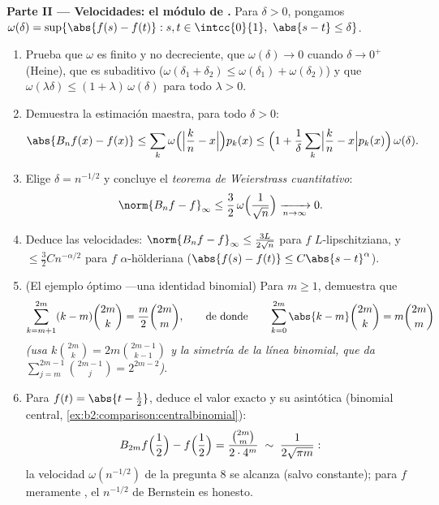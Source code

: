 \begin{problem}
\medskip
\noindent\textbf{Parte II --- Velocidades: el módulo de
.} Para $\delta > 0$, pongamos $\omega(\delta) =
\sup\{\abs{f(s) - f(t)} : s, t \in \intcc{0}{1},\ \abs{s - t} \leq
\delta\}$.
\begin{enumerate}[resume]
  \item Prueba que $\omega$ es finito y no decreciente, que
        $\omega(\delta) \to 0$ cuando $\delta \to 0^+$ (Heine), que
        es subaditivo ($\omega(\delta_1 + \delta_2) \leq
        \omega(\delta_1) + \omega(\delta_2)$) y que
        $\omega(\lambda\delta) \leq (1 + \lambda)\,\omega(\delta)$
        para todo $\lambda > 0$.
  \item Demuestra la estimación maestra, para todo $\delta > 0$:
        \[
        \abs{B_nf(x) - f(x)}
        \leq \sum_k \omega\Bigl(\Bigl|\frac kn -
        x\Bigr|\Bigr)p_k(x)
        \leq \Bigl(1 + \frac1\delta\sum_k\Bigl|\frac kn -
        x\Bigr|p_k(x)\Bigr)\,\omega(\delta) .
        \]
  \item Elige $\delta = n^{-1/2}$ y concluye el \emph{teorema de
        Weierstrass cuantitativo}:
        \[
        \norm{B_nf - f}_\infty \leq
        \frac32\,\omega\Bigl(\frac{1}{\sqrt n}\Bigr)
        \xrightarrow[n\to\infty]{} 0 .
        \]
  \item Deduce las velocidades: $\norm{B_nf - f}_\infty \leq
        \frac{3L}{2\sqrt n}$ para $f$ $L$-lipschitziana, y $\leq
        \frac32 C n^{-\alpha/2}$ para $f$ $\alpha$-hölderiana
        ($\abs{f(s) - f(t)} \leq C\abs{s-t}^\alpha$).
  \item (El ejemplo óptimo ---una identidad binomial) Para $m \geq
        1$, demuestra que
        \[
        \sum_{k=m+1}^{2m} (k - m)\binom{2m}{k}
        = \frac{m}{2}\binom{2m}{m},
        \qquad\text{de donde}\qquad
        \sum_{k=0}^{2m}\abs{k - m}\binom{2m}{k}
        = m\binom{2m}{m}
        \]
        \emph{(usa $k\binom{2m}k = 2m\binom{2m-1}{k-1}$ y la
        simetría de la línea binomial, que da
        $\sum_{j=m}^{2m-1}\binom{2m-1}{j} = 2^{2m-2}$)}.
  \item Para $f(t) = \abs{t - \frac12}$, deduce el valor exacto y su
        asintótica (binomial central,
        \cref{ex:b2:comparison:centralbinomial}):
        \[
        B_{2m}f\Bigl(\frac12\Bigr) - f\Bigl(\frac12\Bigr)
        = \frac{\binom{2m}{m}}{2\cdot4^{m}}
        \;\sim\; \frac{1}{2\sqrt{\pi m}} :
        \]
        la velocidad $\omega(n^{-1/2})$ de la pregunta 8 se alcanza
        (salvo constante); para $f$ meramente , el
        $n^{-1/2}$ de Bernstein es honesto.
\end{enumerate}


\end{problem}

